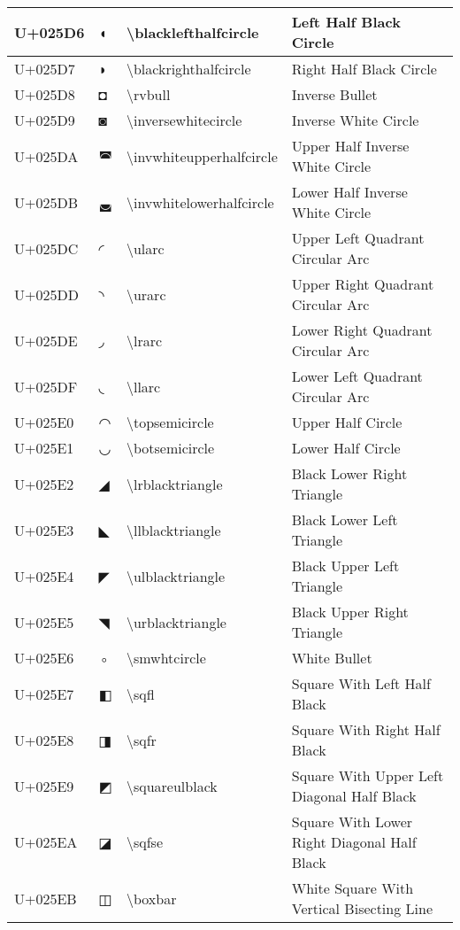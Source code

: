 \begin{table}[h]
\begin{tabulary}{\linewidth}{|L|L|L|L|}
\hline
U+025D6 & ◖ & {\textbackslash}blacklefthalfcircle & Left Half Black Circle \\
\hline
U+025D7 & ◗ & {\textbackslash}blackrighthalfcircle & Right Half Black Circle \\
\hline
U+025D8 & ◘ & {\textbackslash}rvbull & Inverse Bullet \\
\hline
U+025D9 & ◙ & {\textbackslash}inversewhitecircle & Inverse White Circle \\
\hline
U+025DA & ◚ & {\textbackslash}invwhiteupperhalfcircle & Upper Half Inverse White Circle \\
\hline
U+025DB & ◛ & {\textbackslash}invwhitelowerhalfcircle & Lower Half Inverse White Circle \\
\hline
U+025DC & ◜ & {\textbackslash}ularc & Upper Left Quadrant Circular Arc \\
\hline
U+025DD & ◝ & {\textbackslash}urarc & Upper Right Quadrant Circular Arc \\
\hline
U+025DE & ◞ & {\textbackslash}lrarc & Lower Right Quadrant Circular Arc \\
\hline
U+025DF & ◟ & {\textbackslash}llarc & Lower Left Quadrant Circular Arc \\
\hline
U+025E0 & ◠ & {\textbackslash}topsemicircle & Upper Half Circle \\
\hline
U+025E1 & ◡ & {\textbackslash}botsemicircle & Lower Half Circle \\
\hline
U+025E2 & ◢ & {\textbackslash}lrblacktriangle & Black Lower Right Triangle \\
\hline
U+025E3 & ◣ & {\textbackslash}llblacktriangle & Black Lower Left Triangle \\
\hline
U+025E4 & ◤ & {\textbackslash}ulblacktriangle & Black Upper Left Triangle \\
\hline
U+025E5 & ◥ & {\textbackslash}urblacktriangle & Black Upper Right Triangle \\
\hline
U+025E6 & ◦ & {\textbackslash}smwhtcircle & White Bullet \\
\hline
U+025E7 & ◧ & {\textbackslash}sqfl & Square With Left Half Black \\
\hline
U+025E8 & ◨ & {\textbackslash}sqfr & Square With Right Half Black \\
\hline
U+025E9 & ◩ & {\textbackslash}squareulblack & Square With Upper Left Diagonal Half Black \\
\hline
U+025EA & ◪ & {\textbackslash}sqfse & Square With Lower Right Diagonal Half Black \\
\hline
U+025EB & ◫ & {\textbackslash}boxbar & White Square With Vertical Bisecting Line \\

\end{tabulary}
\end{table}
